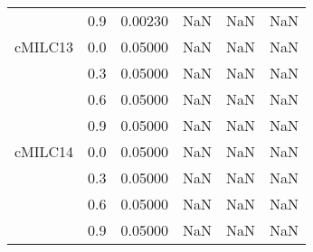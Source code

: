\begin{longtable}{cccccc}
        & 0.9 & 0.00230 & NaN & NaN & NaN \\
cMILC13 & 0.0 & 0.05000 & NaN & NaN & NaN \\
        & 0.3 & 0.05000 & NaN & NaN & NaN \\
        & 0.6 & 0.05000 & NaN & NaN & NaN \\
        & 0.9 & 0.05000 & NaN & NaN & NaN \\
cMILC14 & 0.0 & 0.05000 & NaN & NaN & NaN \\
        & 0.3 & 0.05000 & NaN & NaN & NaN \\
        & 0.6 & 0.05000 & NaN & NaN & NaN \\
        & 0.9 & 0.05000 & NaN & NaN & NaN \\
\end{longtable}
